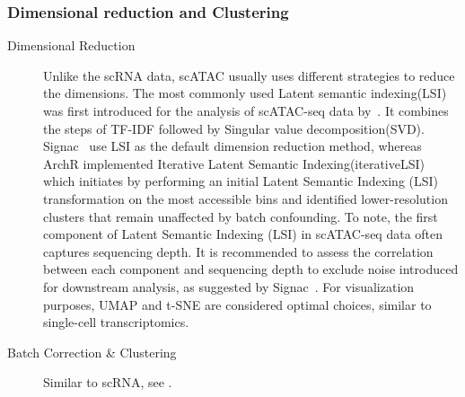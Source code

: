 \subsubsection{Dimensional reduction and Clustering}
\begin{description}
	\item[Dimensional Reduction]
	Unlike the scRNA data, scATAC usually uses different strategies to reduce the dimensions. The most commonly used Latent semantic indexing(LSI) was first introduced for the analysis of scATAC-seq data by~\citep{cusanovich2015multiplex}. It combines the steps of TF-IDF followed by Singular value decomposition(SVD). Signac~\citep{signac} use LSI as the default dimension reduction method, whereas ArchR implemented Iterative Latent Semantic Indexing(iterativeLSI)~\citep{satpathy2019massively, granja2019single} which initiates by performing an initial Latent Semantic Indexing (LSI) transformation on the most accessible bins and identified lower-resolution clusters that remain unaffected by batch confounding. To note, the first component of Latent Semantic Indexing (LSI) in scATAC-seq data often captures sequencing depth. It is recommended to assess the correlation between each component and sequencing depth to exclude noise introduced for downstream analysis, as suggested by Signac~\citep{signac}. For visualization purposes, UMAP and t-SNE are considered optimal choices, similar to single-cell transcriptomics.

	\item[Batch Correction \& Clustering]
	Similar to scRNA, see .


\end{description}

